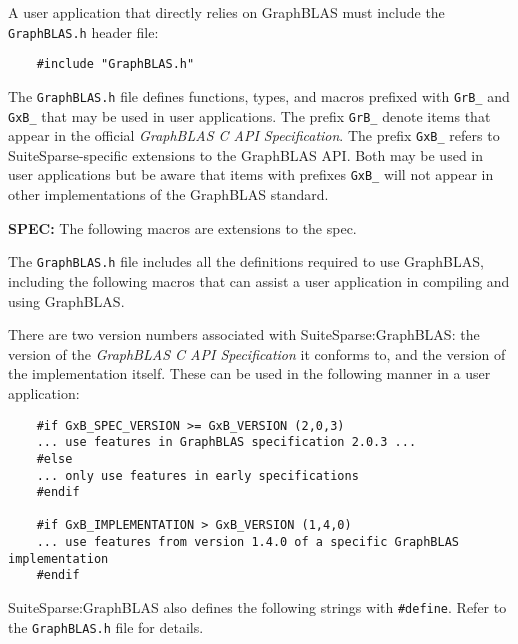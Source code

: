 \documentclass[12pt]{article}
\begin{document}
A user application that directly relies on GraphBLAS must include the
\verb'GraphBLAS.h' header file:

\begin{mdframed}[userdefinedwidth=6in]
{\footnotesize
\begin{verbatim}
    #include "GraphBLAS.h"
\end{verbatim}
} \end{mdframed}

The \verb'GraphBLAS.h' file defines functions, types, and macros prefixed with
\verb'GrB_' and \verb'GxB_' that may be used in user applications.  The prefix
\verb'GrB_' denote items that appear in the official {\em GraphBLAS C API
Specification}.  The prefix \verb'GxB_' refers to SuiteSparse-specific
extensions to the GraphBLAS API.  Both may be used in user applications but be
aware that items with prefixes \verb'GxB_' will not appear in other
implementations of the GraphBLAS standard.

\begin{spec}
{\bf SPEC:} The following macros are extensions to the spec.
\end{spec}

The \verb'GraphBLAS.h' file includes all the definitions required to use
GraphBLAS, including the following macros that can assist a user application in
compiling and using GraphBLAS.

There are two version numbers associated with SuiteSparse:GraphBLAS:
the version of the {\em GraphBLAS C API Specification} it
conforms to, and the version of the implementation itself.  These can
be used in the following manner in a user application:

{\footnotesize
\begin{verbatim}
    #if GxB_SPEC_VERSION >= GxB_VERSION (2,0,3)
    ... use features in GraphBLAS specification 2.0.3 ...
    #else
    ... only use features in early specifications
    #endif

    #if GxB_IMPLEMENTATION > GxB_VERSION (1,4,0)
    ... use features from version 1.4.0 of a specific GraphBLAS implementation
    #endif \end{verbatim}}


SuiteSparse:GraphBLAS also defines the following strings with \verb'#define'.
Refer to the \verb'GraphBLAS.h' file for details.
\end{document}
